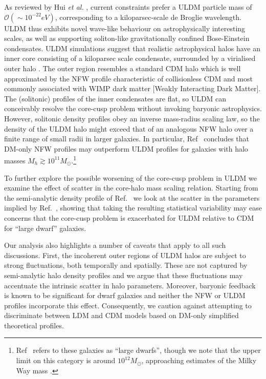\documentclass{pasa}%
\begin{document}
As reviewed by Hui {\em et al.\/} \cite{Hui:2016ltb}, current constraints prefer a ULDM particle mass of $\mathcal{O}(\sim 10^{-22}eV)$, corresponding to a kiloparsec-scale de Broglie wavelength. ULDM thus exhibits novel wave-like behaviour on astrophysically interesting scales, as well as supporting soliton-like gravitationally confined Bose-Einstein condensates. ULDM simulations suggest that realistic astrophysical halos have an inner core consisting of a kiloparsec scale condensate, surrounded by a virialised outer halo \cite{Schwabe:2016rze, Veltmaat:2018dfz}. The outer region resembles a standard CDM halo which is well approximated by the NFW \cite{Navarro:1995iw} profile characteristic of collisionless CDM and most commonly associated with WIMP dark matter [Weakly Interacting Dark Matter]. 
The (solitonic) profiles of the inner condensates are flat, so ULDM can conceivably resolve the core-cusp problem without invoking baryonic astrophysics. However, solitonic density profiles obey an inverse mass-radius scaling law, so the density of the ULDM halo might exceed that of an analogous NFW halo over a finite range of small radii in larger galaxies. In particular, Ref~\cite{Robles:2018fur} concludes that DM-only NFW profiles may outperform ULDM profiles for galaxies with halo masses $M_h \gtrsim 10^{11} M_{\odot}$.\footnote{ Ref~\cite{Robles:2018fur}  refers to these galaxies as ``large dwarfs'', though we note that the upper limit on this category is around $10^{12} M_{\odot}$, approaching estimates of the Milky Way mass \cite{Watkins2019ApJ}.}


To further explore the possible worsening of the core-cusp problem in ULDM  we examine the effect of scatter in the core-halo mass scaling relation. Starting from the semi-analytic density profile of Ref.~\cite{Robles:2018fur} we look at the scatter in the parameters implied by Ref.~\cite{Schive:2014hza}, showing that taking the resulting statistical variability may ease concerns that the core-cusp problem is exacerbated for ULDM relative to CDM for ``large dwarf'' galaxies. 

Our analysis also highlights a number of caveats that apply to all such discussions. First, the incoherent outer regions of ULDM halos are subject to strong fluctuations, both temporally and spatially. These are not captured by semi-analytic halo density profiles and we argue that these fluctuations may accentuate the intrinsic scatter in halo parameters. Moreover, baryonic feedback is known to be significant for dwarf galaxies \cite{2018MNRAS.473.5698D, Benitez-Llambay:2018} and neither the NFW or ULDM profiles incorporate this effect. Consequently, we caution against attempting to discriminate between LDM and CDM models based on DM-only simplified theoretical profiles. 
\end{document}
